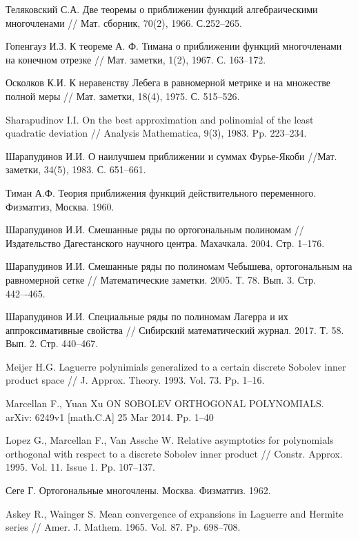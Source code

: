 \begin{thebibliography}{111}
{Теляковский С.А.}
 Две теоремы о приближении функций алгебраическими многочленами
// Мат. сборник, 70(2), 1966. С.252--265.


{Гопенгауз И.З.}
 К теореме А. Ф. Тимана о приближении функций многочленами на конечном отрезке
// Мат. заметки, 1(2), 1967. С. 163--172.


{Осколков К.И.}
 К неравенству Лебега в равномерной метрике и на множестве полной меры
// Мат.  заметки, 18(4), 1975. С. 515--526.


{Sharapudinov I.I.}
 On the best approximation and polinomial of the least quadratic deviation
// Analysis Mathematica, 9(3), 1983. Pp. 223--234.


{Шарапудинов И.И.}
 О наилучшем приближении и суммах Фурье-Якоби
//Мат. заметки, 34(5), 1983. С. 651--661.


{Тиман А.Ф.} Теория приближения функций действительного переменного. Физматгиз, Москва. 1960.


{Шарапудинов И.И.}
Смешанные ряды по ортогональным полиномам // Издательство Дагестанского научного центра. Махачкала. 2004. Стр. 1--176.


{Шарапудинов И.И.}
Смешанные ряды по полиномам Чебышева, ортогональным на равномерной сетке // Математические заметки. 2005. Т. 78. Вып. 3. Стр. 442–-465.


{Шарапудинов И.И.}
Специальные ряды по полиномам Лагерра и их аппроксимативные свойства // Сибирский математический журнал. 2017. Т. 58. Вып. 2. Стр. 440--467.


{Meijer H.G.}
Laguerre polynimials generalized to a certain discrete Sobolev inner product space // J. Approx. Theory. 1993. Vol. 73. Pp. 1--16.


{Marcellan F., Yuan Xu}
ON SOBOLEV ORTHOGONAL POLYNOMIALS. arXiv: 6249v1 [math.C.A] 25 Mar 2014. Pp. 1--40


{Lopez G., Marcellan F., Van Assche W.}
Relative asymptotics for polynomials orthogonal with respect to a discrete Sobolev inner product // Constr. Approx. 1995. Vol. 11. Issue 1. Pp. 107--137.


{Сеге Г.}
Ортогональные многочлены. Москва. Физматгиз. 1962.


{Askey R., Wainger S.}
Mean convergence of expansions in Laguerre and Hermite series // Amer. J. Mathem. 1965. Vol. 87. Pp. 698--708.



\end{thebibliography}
